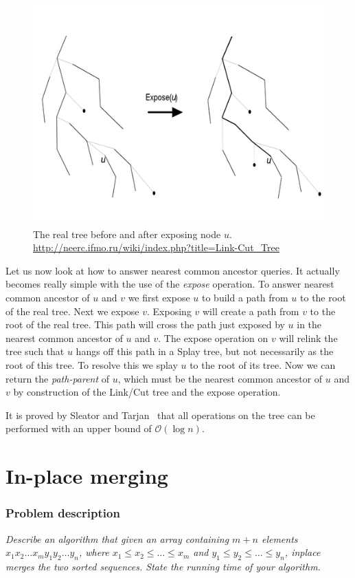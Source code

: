 \documentclass[a4paper,oneside,article,11pt]{memoir}
\begin{document}
\begin{figure}
	\includegraphics[width=\textwidth]{../figures/linkcut-expose.png}
	\caption{\label{fig:lca_expose}The real tree before and after exposing node $u$. \url{http://neerc.ifmo.ru/wiki/index.php?title=Link-Cut_Tree}}
\end{figure}

Let us now look at how to answer nearest common ancestor queries. It actually becomes really simple with the use of the \textit{expose} operation. To answer nearest common ancestor of $u$ and $v$ we first expose $u$ to build a path from $u$ to the root of the real tree. Next we expose $v$. Exposing $v$ will create a path from $v$ to the root of the real tree. This path will cross the path just exposed by $u$ in the nearest common ancestor of $u$ and $v$. The expose operation on $v$ will relink the tree such that $u$ hangs off this path in a Splay tree, but not necessarily as the root of this tree. To resolve this we splay $u$ to the root of its tree. Now we can return the \textit{path-parent} of $u$, which must be the nearest common ancestor of $u$ and $v$ by construction of the Link/Cut tree and the expose operation.

It is proved by Sleator and Tarjan~\cite{Sleator1985} that all operations on the tree can be performed with an upper bound of $\mathcal{O}(\log n)$.

\chapter{In-place merging}
\label{chp:inplace}
\subsection{Problem description}
\textit{Describe an algorithm that given an array containing $m+n$ elements $x_1x_2\dots x_m y_1y_2\dots y_n$, where $x_1\leq x_2\leq \dots \leq x_m$ and $y_1\leq y_2\leq \dots \leq y_n$, inplace merges the two sorted sequences. State the running time of your algorithm.}
\end{document}
